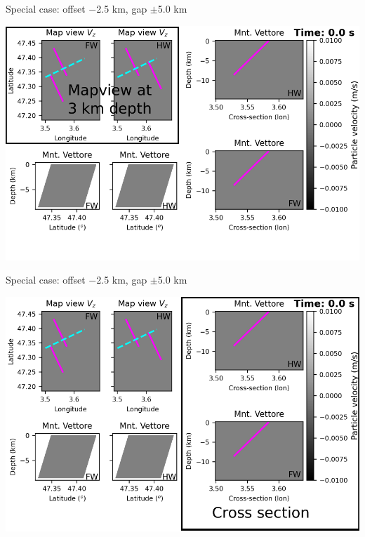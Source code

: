 \documentclass{beamer}
\begin{document}
\begin{frame}
 {Special case: offset $-$2.5 km, gap $\pm$5.0 km}

\begin{center}
    \includegraphics[width=1\linewidth]{images/horizontal_delta_00000a}
\end{center}
\addtocounter{framenumber}{-1}
 
\end{frame}


\begin{frame}
 {Special case: offset $-$2.5 km, gap $\pm$5.0 km}

\begin{center}
    \includegraphics[width=1\linewidth]{images/horizontal_delta_00000b}
\end{center}
\addtocounter{framenumber}{-1}
 
\end{frame}
\end{document}
